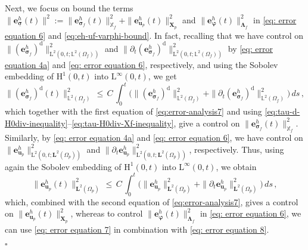 \documentclass[11pt]{article}
\numberwithin{equation}{section}
\newcommand{\bLambda}{{\boldsymbol\Lambda}}
\newcommand{\bsi}{{\boldsymbol\sigma}}
\newcommand{\bvarphi}{{\boldsymbol\varphi}}
\newcommand{\ubsi}{\underline{\bsi}}
\newcommand{\bu}{\mathbf{u}}
\newcommand{\be}{{\mathbf{e}}}
\newcommand{\0}{{\mathbf{0}}}
\def\bX{\mathbf{X}}
\newcommand{\bL}{\mathbf{L}}
\newcommand\bbX{\mathbb{X}}
\newcommand\bbL{\mathbb{L}}
\def\H{\mathrm{H}}
\def\L{\mathrm{L}}
\def\rd{\mathrm{d}}
\newenvironment{proof}{\noindent{\it Proof.}}{\hfill$\square$}
\numberwithin{equation}{section}
\begin{document}
\begin{proof}
Next, we focus on bound the terms $\|\be_{\ubsi}^h(t)\|^2:=\|\be_{\bsi_f}^h(t)\|^2_{\bbX_f} + \|\be_{\bu_p}^h(t)\|^2_{\bX_p}$ and $\|\be_{\bvarphi}^h(t)\|^2_{\bLambda_f}$ in \eqref{eq: error equation 6} and \eqref{eq:eh-uf-varphi-bound}.
In fact, recalling that we have control on $\|(\be_{\bsi_f}^h)^\rd\|^2_{\L^2(0,t;\bbL^2(\Omega_f))}$ and $\|\partial_t(\be_{\bsi_f}^h)^\rd\|^2_{\L^2(0,t;\bbL^2(\Omega_f))}$ by \eqref{eq: error equation 4a} and \eqref{eq: error equation 6}, respectively, and using the Sobolev embedding of $\H^1(0,t)$ into $\L^\infty(0,t)$, we get
%
\begin{equation}\label{eq: error equation 8}
\|(\be_{\bsi_f}^h)^\rd(t)\|^2_{\bbL^2(\Omega_f)} 
\,\leq\, C\,\int_0^t \Big(\|(\be_{\bsi_f}^h)^\rd\|^2_{\bbL^2(\Omega_f)} 
+ \|\partial_t(\be_{\bsi_f}^h)^\rd\|^2_{\bbL^2(\Omega_f)}\Big)\,ds \,,
\end{equation}
%
which together with the first equation of \eqref{eq:error-analysis7} and using \eqref{eq:tau-d-H0div-inequality}--\eqref{eq:tau-H0div-Xf-inequality}, give a control on $\|\be_{\bsi_f}^h(t)\|^2_{\bbX_f}$. 
%
Similarly, by \eqref{eq: error equation 4a} and \eqref{eq: error equation 6}, we have control on $\|\be_{\bu_p}^h\|^2_{\L^2(0,t;\bL^2(\Omega_p))}$ and $\|\partial_t\be_{\bu_p}^h\|^2_{\L^2(0,t;\bL^2(\Omega_p))}$, respectively. 
Thus, using again the Sobolev embedding of $\H^1(0,t)$ into $\L^\infty(0,t)$, we obtain
%
\begin{equation}\label{eq: error equation 9}
\|\be_{\bu_p}^h(t)\|^2_{\bL^2(\Omega_p)}
\,\leq\, C\,\int_0^t \Big(\|\be_{\bu_p}^h\|^2_{\bL^2(\Omega_p)} 
+ \|\partial_t\be_{\bu_p}^h\|^2_{\bL^2(\Omega_p)}\Big)\,ds \,,
\end{equation}
%
which, combined with the second equation of \eqref{eq:error-analysis7}, gives a control on $\|\be_{\bu_p}^h(t)\|^2_{\bX_p}$, whereas to control $\|\be_{\bvarphi}^h(t)\|^2_{\bLambda_f}$ in \eqref{eq: error equation 6}, we can use \eqref{eq: error equation 7} in combination with \eqref{eq: error equation 8}.


\end{proof}
\end{document}
